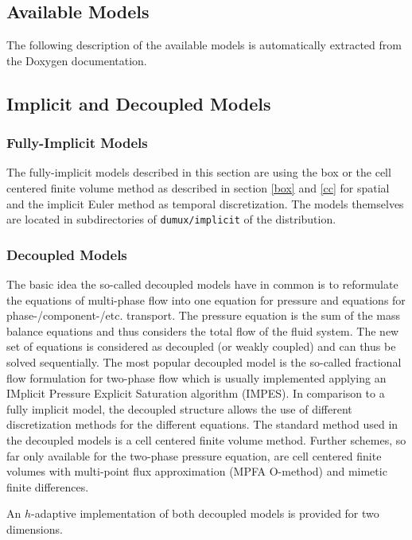 \subsection{Available Models}

The following description of the available models is automatically extracted
from the Doxygen documentation.

\subsection{Implicit and Decoupled Models}

\subsubsection{Fully-Implicit Models}
The fully-implicit models described in this section are using the box or the
cell centered finite volume method as described in section \ref{box} and \ref{cc}
for spatial and the implicit Euler
method as temporal discretization. The models themselves are located in
subdirectories of \texttt{dumux/implicit} of the \Dumux distribution.

\subsubsection{Decoupled Models}
The basic idea the so-called decoupled models have in common is to reformulate the
equations of multi-phase flow into one equation for
pressure and equations for phase-/component-/etc. transport. The pressure equation
is the sum of the mass balance equations and thus considers the total flow of the
fluid system. The new set of equations is considered as decoupled (or weakly coupled)
and can thus be solved sequentially. The most popular decoupled model is the so-called
fractional flow formulation for two-phase flow which is usually implemented applying
an IMplicit Pressure Explicit Saturation algorithm (IMPES).
In comparison to a fully implicit model, the decoupled structure allows the use of
different discretization methods for the different equations. The standard method
used in the decoupled models is a cell centered finite volume method. Further schemes,
so far only available for the two-phase pressure equation, are cell centered finite
volumes with multi-point flux approximation (MPFA O-method) and mimetic finite differences.

An $h$-adaptive implementation of both decoupled models is provided for two dimensions.
